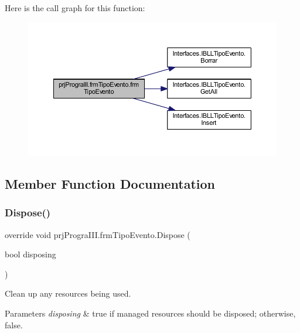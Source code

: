 Here is the call graph for this function\+:
\nopagebreak
\begin{figure}[H]
\begin{center}
\leavevmode
\includegraphics[width=350pt]{classprj_progra_i_i_i_1_1frm_tipo_evento_a0c0ddf17875c0f054d4c38bb6793605e_cgraph}
\end{center}
\end{figure}


\subsection{Member Function Documentation}
\hypertarget{classprj_progra_i_i_i_1_1frm_tipo_evento_acb1b45357fdadc0bb443b87f79a31d57}{}\label{classprj_progra_i_i_i_1_1frm_tipo_evento_acb1b45357fdadc0bb443b87f79a31d57} 
\subsubsection{\texorpdfstring{Dispose()}{Dispose()}}
{\footnotesize\ttfamily override void prj\+Progra\+I\+I\+I.\+frm\+Tipo\+Evento.\+Dispose (\begin{DoxyParamCaption}\item[{bool}]{disposing }\end{DoxyParamCaption})\hspace{0.3cm}{\ttfamily [protected]}}



Clean up any resources being used. 


\begin{DoxyParams}{Parameters}
{\em disposing} & true if managed resources should be disposed; otherwise, false.\\
\hline
\end{DoxyParams}


